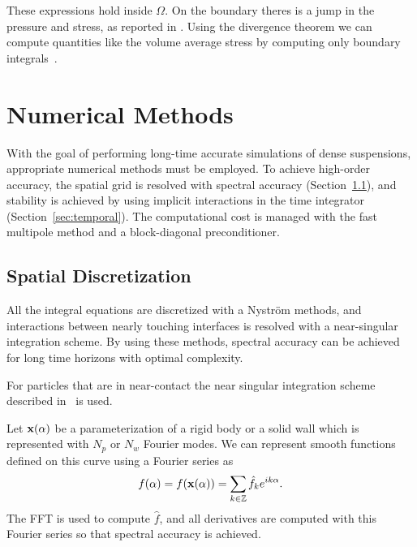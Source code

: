 \documentclass[preprint, 10pt]{elsarticle}
\begin{document}
These expressions hold inside $\Omega$. On the boundary theres is a jump in the pressure and stress, as reported in \cite{Quaife2014}.
Using the divergence theorem we can compute quantities like the volume average stress by computing only boundary integrals~\cite{Pozrikidis1992}. 
		
\section{Numerical Methods\label{s:method}} 

With the goal of performing long-time accurate simulations of dense
suspensions, appropriate numerical methods must be employed.  To achieve
high-order accuracy, the spatial grid is resolved with spectral accuracy
(Section~\ref{sec:spatial}), and stability is achieved by using implicit
interactions in the time integrator (Section~\ref{sec:temporal}). The computational cost is managed
with the fast multipole method
\cite{Greenbaum1992} and a
block-diagonal preconditioner.


\subsection{Spatial Discretization}\label{sec:spatial}

All the integral equations are discretized
with a Nystr\"om  methods, and interactions between nearly touching
interfaces is resolved with a near-singular integration scheme. By using
these methods, spectral accuracy can be achieved for long time horizons
with optimal complexity.

For particles that are in near-contact the near singular
integration scheme described in~\cite{Quaife2014, Ying2006} is used.

Let ${\mathbf{x}}(\alpha)$ be a parameterization of a rigid body or a solid
wall which is represented with $N_p$ or $N_w$ Fourier modes. We can represent
smooth functions defined on this curve using a
Fourier series as
\begin{align}
  f(\alpha) = f({\mathbf{x}}(\alpha)) = \sum_{k \in {\mathbb{Z}}} \hat{f}_k e^{ik\alpha}.
\end{align}
The FFT is used to compute $\hat{f}$, and all derivatives are computed
with this Fourier series so that spectral accuracy is achieved.
\end{document}
